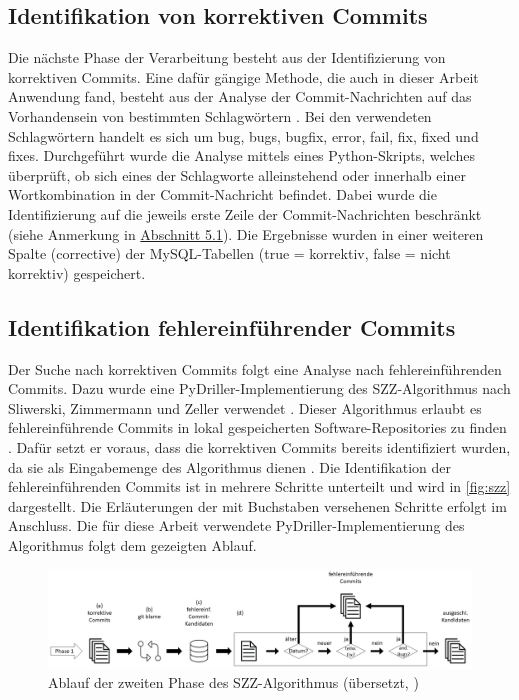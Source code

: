 \subsection*{Identifikation von korrektiven Commits}

Die nächste Phase der Verarbeitung besteht aus der Identifizierung von korrektiven Commits. Eine dafür gängige Methode, die auch in dieser Arbeit Anwendung fand, besteht aus der Analyse der Commit-Nachrichten auf das Vorhandensein von bestimmten Schlagwörtern \cite{Zimmermann2007}. Bei den verwendeten Schlagwörtern handelt es sich um \glqq bug\grqq, \glqq bugs\grqq{}, \glqq bugfix\grqq{}, \glqq error\grqq, \glqq fail\grqq{}, \glqq fix\grqq, \glqq fixed\grqq{} und \glqq fixes\grqq. Durchgeführt wurde die Analyse mittels eines Python-Skripts, welches überprüft, ob sich eines der Schlagworte alleinstehend oder innerhalb einer Wortkombination in der Commit-Nachricht befindet. Dabei wurde die Identifizierung auf die jeweils erste Zeile der Commit-Nachrichten beschränkt (siehe Anmerkung in \hyperref[heuristic]{Abschnitt 5.1}). Die Ergebnisse wurden in einer weiteren Spalte (\glqq corrective\grqq) der MySQL-Tabellen (true = korrektiv, false = nicht korrektiv) gespeichert.

\subsection*{Identifikation fehlereinführender Commits}
\label{szz-def}
Der Suche nach korrektiven Commits folgt eine Analyse nach fehlereinführenden Commits. Dazu wurde eine PyDriller-Implementierung des SZZ-Algorithmus nach Sliwerski, Zimmermann und Zeller verwendet \cite{Sliwerski2005,Spadini2018}. Dieser Algorithmus erlaubt es fehlereinführende Commits in lokal gespeicherten Software-Repositories zu finden \cite{Borg2019}. Dafür setzt er voraus, dass die korrektiven Commits bereits identifiziert wurden, da sie als Eingabemenge des Algorithmus dienen \cite{Borg2019}. Die Identifikation der fehlereinführenden Commits ist in mehrere Schritte unterteilt und wird in \autoref{fig:szz} dargestellt. Die Erläuterungen der mit Buchstaben versehenen Schritte erfolgt im Anschluss. Die für diese Arbeit verwendete PyDriller-Implementierung des Algorithmus folgt dem gezeigten Ablauf.

\begin{figure}[ht]
    \centering
    \includegraphics[width=\textwidth]{images/SZZ}
    \caption{Ablauf der zweiten Phase des SZZ-Algorithmus (übersetzt, \cite{Borg2019})\label{fig:szz}}
\end{figure}

